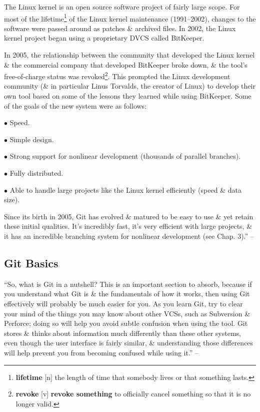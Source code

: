 \documentclass[oneside]{book}
\numberwithin{equation}{section}
\begin{document}
The Linux kernel is an open source software project of fairly large scope. For most of the lifetime\footnote{\textbf{lifetime} [n] the length of time that somebody lives or that something lasts.} of the Linux kernel maintenance (1991--2002), changes to the software were passed around as patches \& archived files. In 2002, the Linux kernel project began using a proprietary DVCS called BitKeeper.

In 2005, the relationship between the community that developed the Linux kernel \& the commercial company that developed BitKeeper broke down, \& the tool's free-of-charge status was revoked\footnote{\textbf{revoke} [v] \textbf{revoke something} to officially cancel something so that it is no longer valid.}. This prompted the Linux development community (\& in particular Linus Torvalds, the creator of Linux) to develop their own tool based on some of the lessons they learned while using BitKeeper. Some of the goals of the new system were as follows:
\begin{enumerate*}
	\item[$\bullet$] Speed.
	\item[$\bullet$] Simple design.
	\item[$\bullet$] Strong support for nonlinear development (thousands of parallel branches).
	\item[$\bullet$] Fully distributed.
	\item[$\bullet$] Able to handle large projects like the Linux kernel efficiently (speed \& data size).
\end{enumerate*}
Since its birth in 2005, Git has evolved \& matured to be easy to use \& yet retain these initial qualities. It's incredibly fast, it's very efficient with large projects, \& it has an incredible branching system for nonlinear development (see Chap. 3).'' -- \cite[p. 5]{Chacon_Straub2014}

\subsection{Git Basics}
``So, what is Git in a nutshell? This is an important section to absorb, because if you understand what Git is \& the fundamentals of how it works, then using Git effectively will probably be much easier for you. As you learn Git, try to clear your mind of the things you may know about other VCSs, such as Subversion \& Perforce; doing so will help you avoid subtle confusion when using the tool. Git stores \& thinks about information much differently than these other systems, even though the user interface is fairly similar, \& understanding those differences will help prevent you from becoming confused while using it.'' -- \cite[p. 5]{Chacon_Straub2014}
\end{document}

